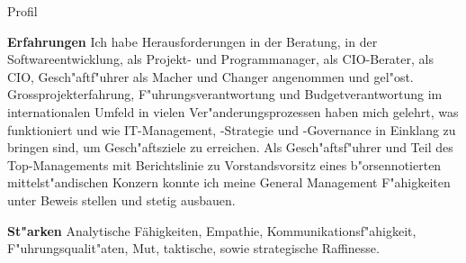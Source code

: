 \begin{rubric}{Profil}

\entry* \textbf{Erfahrungen}\newline 
Ich habe Herausforderungen in der Beratung, in der Softwareentwicklung, als Projekt- und Programmanager, als CIO-Berater, als CIO, Gesch"aftf"uhrer als Macher und Changer angenommen und gel"ost. Grossprojekterfahrung, F"uhrungsverantwortung und Budgetverantwortung im internationalen Umfeld in vielen Ver"anderungsprozessen haben mich gelehrt, was funktioniert und wie IT-Management, -Strategie und -Governance in Einklang zu bringen sind, um Gesch"aftsziele zu erreichen. Als Gesch"aftsf"uhrer und Teil des Top-Managements mit Berichtslinie zu Vorstandsvorsitz eines b"orsennotierten mittelst"andischen Konzern konnte ich meine General Management F"ahigkeiten unter Beweis stellen und stetig ausbauen.

\entry* \textbf{St"arken}\newline 
Analytische Fähigkeiten, Empathie, Kommunikationsf"ahigkeit, F"uhrungsqualit"aten, Mut, taktische, sowie strategische Raffinesse.  
\end{rubric}
